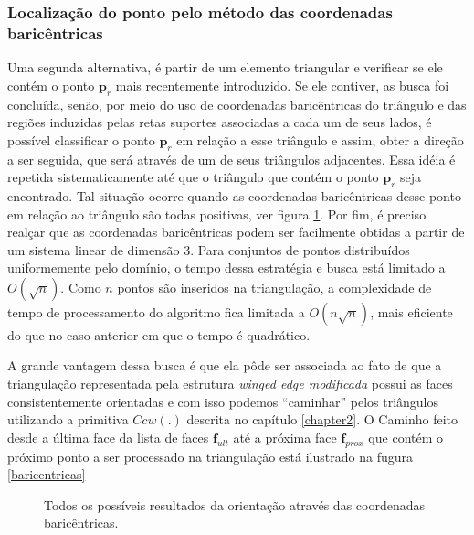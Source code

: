 \documentclass[12pt,a4paper]{book}
\begin{document}
\subsubsection{Localiza\c{c}\~{a}o do ponto pelo m\'{e}todo das coordenadas
baric\^{e}ntricas}

Uma segunda alternativa, \'e partir de um elemento triangular e verificar se ele cont\'em o ponto $\mathbf{p}_r$ mais recentemente introduzido. Se ele contiver, as busca foi conclu\'ida, sen\~ao, por meio do uso de coordenadas baric\^entricas do tri\^angulo e das regi\~oes induzidas pelas retas suportes associadas a cada um de seus lados, \'e poss\'ivel classificar o ponto $\mathbf{p}_r$ em rela\c{c}\~{a}o a esse tri\^angulo e assim, obter a dire\c{c}\~{a}o a ser seguida, que ser\'a atrav\'es de um de seus tri\^angulos adjacentes. Essa id\'eia \'e repetida sistematicamente at\'e que o tri\^angulo que cont\'em o ponto $\mathbf{p}_r$ seja encontrado. Tal situa\c{c}\~{a}o ocorre quando as coordenadas baric\^entricas desse ponto em rela\c{c}\~{a}o ao tri\^angulo s\~ao todas positivas, ver figura \ref{fig12_chapter6}. Por fim, \'e preciso real\c{c}{a}r que as coordenadas baric\^entricas podem ser facilmente obtidas a partir de um sistema linear de dimens\~ao 3. Para conjuntos de pontos distribu\'idos uniformemente pelo dom\'inio, o tempo dessa estrat\'egia e busca est\'a
limitado a $O(\sqrt{n})$. Como $n$ pontos s\~ao inseridos na triangula\c{c}\~{a}o, a complexidade de tempo de processamento do algoritmo fica limitada a $O(n\sqrt{n})$, mais eficiente do que no caso anterior em que o tempo \'e quadr\'atico.

A grande vantagem dessa busca \'e que ela p\^ode ser associada ao fato de que a triangula\c{c}\~{a}o representada pela estrutura \textit{winged edge modificada} possui as faces consistentemente orientadas e com isso podemos ``caminhar'' pelos tri\^angulos utilizando a primitiva $Ccw(.)$ descrita no cap\'itulo \ref{chapter2}. O Caminho feito desde a \'ultima face da lista de faces $\mathbf{f}_{ult}$ at\'e a pr\'oxima face $\mathbf{f}_{prox}$ que cont\'em o pr\'oximo ponto a ser processado na triangula\c{c}\~{a}o est\'a ilustrado na fugura \ref{baricentricas}

\begin{figure}[htbp]
  \begin{center}
    \leavevmode
    
    \caption{Todos os poss\'{i}veis resultados da orienta\c{c}\~{a}o atrav\'{e}s das 
             coordenadas baric\^{e}ntricas.}
    \label{fig12_chapter6}
  \end{center}
\end{figure}
\end{document}
